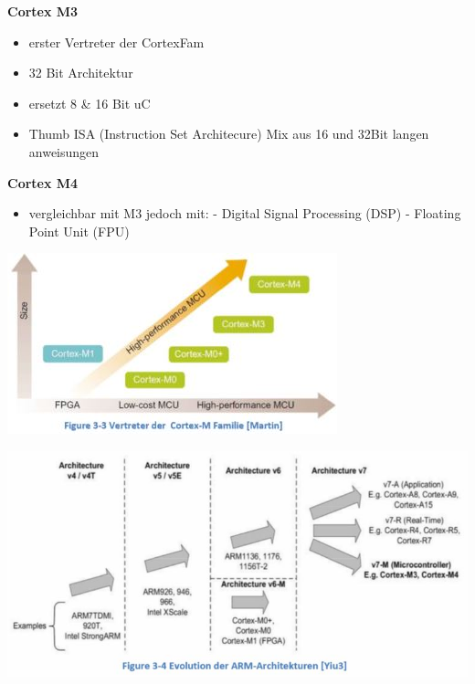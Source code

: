 \begin{multicols}{2}
   \textbf{Cortex M3}     
     \begin{itemize}
         \item erster Vertreter der CortexFam
         \item 32 Bit Architektur
         \item ersetzt 8 \& 16 Bit uC
         \item Thumb ISA (Instruction Set Architecure)\newline
         Mix aus 16 und 32Bit langen anweisungen
     \end{itemize}   
               
     \textbf{Cortex M4} 
     \begin{itemize}
        \item vergleichbar mit M3 jedoch mit:
        \subitem - Digital Signal Processing (DSP)
        \subitem - Floating Point Unit (FPU)
        \newline
      \end{itemize}  
\end{multicols}
\begin{multicols}{2}
    \includegraphics[width=\linewidth]{images/cortexmfam}
    
    \includegraphics[width=\linewidth]{images/cortexmcomp}
\end{multicols}

